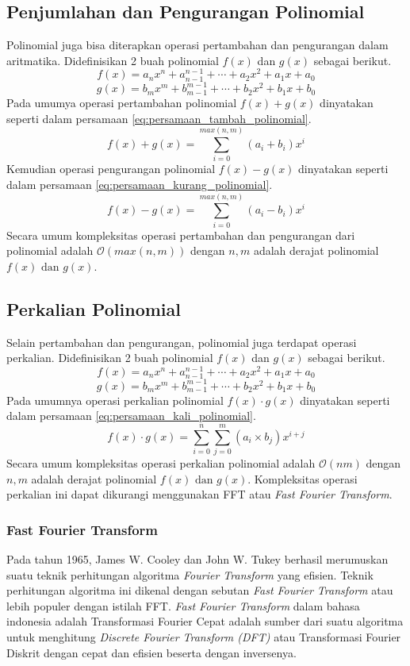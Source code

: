 \subsection{Penjumlahan dan Pengurangan Polinomial}
Polinomial juga bisa diterapkan operasi pertambahan dan pengurangan dalam aritmatika. 
Didefinisikan 2 buah polinomial $f(x)$ dan $g(x)$ sebagai berikut.
$$ f(x) = a_n x^n + a_{n-1}^{n-1} + \cdots + a_2x^2 + a_1x + a_0 $$
$$ g(x) = b_m x^m + b_{m-1}^{m-1} + \cdots + b_2x^2 + b_1x + b_0 $$
Pada umumya operasi pertambahan polinomial $ f(x) + g(x) $ dinyatakan seperti dalam persamaan \eqref{eq:persamaan_tambah_polinomial}.
\begin{equation}
	f(x) + g(x) = \sum_{i=0}^{max(n,m)} (a_i + b_i) x^i
	\label{eq:persamaan_tambah_polinomial} 
\end{equation}
Kemudian operasi pengurangan polinomial $ f(x) - g(x) $ dinyatakan seperti dalam persamaan \eqref{eq:persamaan_kurang_polinomial}.
\begin{equation}
	f(x) - g(x) = \sum_{i=0}^{max(n,m)} (a_i - b_i) x^i
	\label{eq:persamaan_kurang_polinomial} 
\end{equation}
Secara umum kompleksitas operasi pertambahan dan pengurangan dari polinomial adalah $ \mathcal{O}{(max(n,m))} $ dengan $ n , m $ adalah derajat polinomial $ f(x) \text{ dan } g(x) $.

\subsection{Perkalian Polinomial}
Selain pertambahan dan pengurangan, polinomial juga terdapat operasi perkalian.
Didefinisikan 2 buah polinomial $f(x)$ dan $g(x)$ sebagai berikut.
$$ f(x) = a_n x^n + a_{n-1}^{n-1} + \cdots + a_2x^2 + a_1x + a_0 $$
$$ g(x) = b_m x^m + b_{m-1}^{m-1} + \cdots + b_2x^2 + b_1x + b_0 $$
Pada umumnya operasi perkalian polinomial $ f(x) \cdot g(x) $ dinyatakan seperti dalam persamaan \eqref{eq:persamaan_kali_polinomial}.
\begin{equation}
	f(x) \cdot g(x) = \sum_{i=0}^{n} \sum_{j=0}^{m} (a_i \times b_j) x^{i+j}
	\label{eq:persamaan_kali_polinomial}
\end{equation}
Secara umum kompleksitas operasi perkalian polinomial adalah $ \mathcal{O}{(nm)} $ dengan $ n , m $ adalah derajat polinomial $ f(x) \text{ dan } g(x) $. Kompleksitas operasi perkalian ini dapat dikurangi menggunakan FFT atau \textit{Fast Fourier Transform}.

\subsubsection{Fast Fourier Transform}
Pada tahun 1965, James W. Cooley dan John W. Tukey berhasil merumuskan suatu teknik perhitungan algoritma \textit{Fourier Transform} yang efisien\cite{fft}. Teknik perhitungan algoritma ini dikenal dengan sebutan \textit{Fast Fourier Transform} atau lebih populer dengan istilah FFT. \textit{Fast Fourier Transform} dalam bahasa indonesia adalah Transformasi Fourier Cepat adalah sumber dari suatu algoritma untuk menghitung \textit{Discrete Fourier Transform (DFT)} atau Transformasi Fourier Diskrit dengan cepat dan efisien beserta dengan inversenya.

